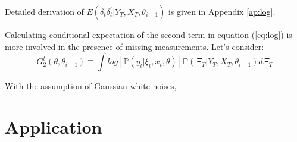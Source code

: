 \documentclass[12pt]{article}
\numberwithin{equation}{section}
\begin{document}
Detailed derivation of $E(\delta_t\delta_t^{'}|Y_T,X_T,\theta_{i-1})$ is given in Appendix \ref{ap:log}. 

Calculating conditional expectation of the second term in equation (\ref{eq:log}) is more involved in the presence of missing measurements. Let's consider:
\[
    G_2^t(\theta,\theta_{i-1}) \equiv \int log[\mathbb{P}(y_t|\xi_{t},x_t, \theta)]\mathbb{P}(\Xi_T|Y_T,X_T,\theta_{i-1})d\Xi_T 
\]

With the assumption of Gaussian white noises, 
\section{Application} \label{sec:apply}








\end{document}
